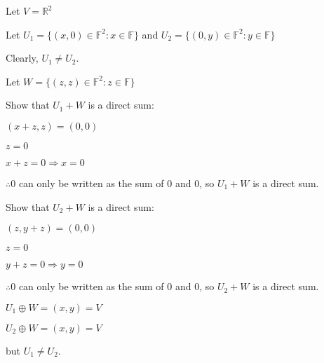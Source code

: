 \documentclass{article}
\begin{document}
\begin{enumerate}[nolistsep]
		Let $V = \mathbb{R}^2$
		
		Let $U_1 = \{(x, 0) \in \mathbb{F}^2 : x \in \mathbb{F}\}$ and $U_2 = \{(0, y) \in \mathbb{F}^2 : y \in \mathbb{F}\}$
		
		Clearly, $U_1 \neq U_2$.
		
		Let $W = \{(z, z) \in \mathbb{F}^2 : z \in \mathbb{F}\}$
		
		Show that $U_1 + W$ is a direct sum:
		
		$(x + z, z) = (0, 0)$
		
		$z = 0$
		
		$x + z = 0 \Rightarrow x = 0$
		
		$\therefore 0$ can only be written as the sum of $0$ and $0$, so $U_1 + W$ is a direct sum.
		
		Show that $U_2 + W$ is a direct sum:
		
		$(z, y + z) = (0, 0)$
		
		$z = 0$
		
		$y + z = 0 \Rightarrow y = 0$
		
		$\therefore 0$ can only be written as the sum of $0$ and $0$, so $U_2 + W$ is a direct sum.
		
		$U_1 \oplus W = (x, y) = V$
		
		$U_2 \oplus W = (x, y) = V$
		
		but $U_1 \neq U_2$.		
	\end{enumerate}
\end{document}
